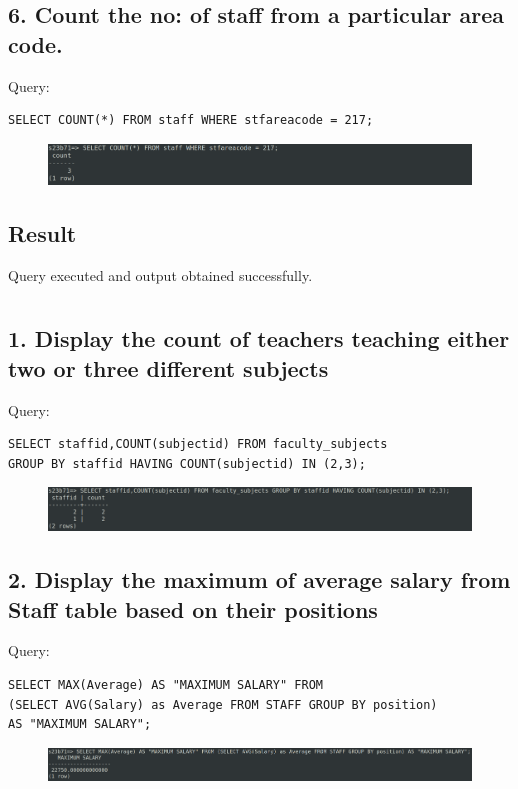 \documentclass{article}
\begin{document}
\subsection*{6. Count the no: of staff from a particular area code.}
Query:
\begin{Verbatim}[frame=single,framerule=1pt,fontfamily=courier,fontsize=\small]
SELECT COUNT(*) FROM staff WHERE stfareacode = 217;
\end{Verbatim}
\begin{figure}[H]
    \centering
    \includegraphics[width=\textwidth]{cycle2/2.6.png}
\end{figure}

\subsection*{Result}
Query executed and output obtained successfully.

\newpage
\section*{}

\subsection*{1. Display the count of teachers teaching either two or three different subjects}
Query:
\begin{Verbatim}[frame=single,framerule=1pt,fontfamily=courier,fontsize=\small]
SELECT staffid,COUNT(subjectid) FROM faculty_subjects 
GROUP BY staffid HAVING COUNT(subjectid) IN (2,3);
\end{Verbatim}
\begin{figure}[H]
    \centering
    \includegraphics[width=\textwidth]{cycle3/3.1.png}
\end{figure}

\subsection*{2. Display the maximum of average salary from Staff table based on their positions}
Query:
\begin{Verbatim}[frame=single,framerule=1pt,fontfamily=courier,fontsize=\small]
SELECT MAX(Average) AS "MAXIMUM SALARY" FROM 
(SELECT AVG(Salary) as Average FROM STAFF GROUP BY position) 
AS "MAXIMUM SALARY";
\end{Verbatim}
\begin{figure}[H]
    \centering
    \includegraphics[width=\textwidth]{cycle3/3.2.png}
\end{figure}
\end{document}

